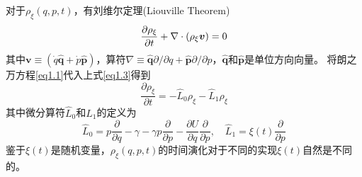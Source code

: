 对于$\rho_{\xi}(q,p,t)$，有刘维尔定理(Liouville Theorem)\cite{Wang2013}
\begin{equation}
    \frac{\partial \rho_{\xi}}{\partial t} + \nabla \cdot \left(\rho_{\xi} \bm{v} \right)=0
    \label{eq1.3}
\end{equation}
其中$\bm{v}\equiv\left(\dot{q}\hat{\mathbf{q}} + \dot{p}\hat{\mathbf{p}}\right)$，算符$\nabla \equiv \hat{\mathbf{q}} \partial / \partial q+\hat{\mathbf{p}} \partial / \partial p$，$\hat{\mathbf{q}}$和$\hat{\mathbf{p}}$是单位方向向量。
将朗之万方程\eqref{eq1.1}代入上式\eqref{eq1.3}得到
\begin{equation}
    \frac{\partial \rho_{\xi}}{\partial t}=-\hat{L}_{0} \rho_{\xi}-\hat{L}_{1} \rho_{\xi}
    \label{eq1.4}
\end{equation}
其中微分算符$\hat{L}_{0}$和$\hat{L}_{1}$的定义为
\begin{equation}
    \hat{L}_{0}=p \frac{\partial}{\partial q}-{\gamma}-{\gamma} p \frac{\partial}{\partial p}-\frac{\partial U}{\partial q} \frac{\partial}{\partial p},\quad \hat{L}_{1}= \xi(t) \frac{\partial}{\partial p}
    \label{eq1.5}
\end{equation}
鉴于$\xi(t)$是随机变量，$\rho_{\xi}(q,p,t)$的时间演化对于不同的实现$\xi(t)$自然是不同的。

